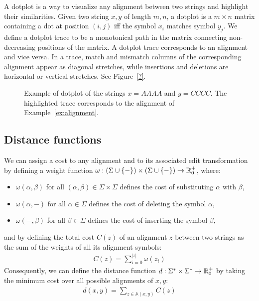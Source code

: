 A dotplot is a way to visualize any alignment between two strings and highlight their similarities.
Given two string $x,y$ of length $m,n$, a dotplot is a $m \times n$ matrix containing a dot at position $(i,j)$ iff the symbol $x_i$ matches symbol $y_j$.
We define a dotplot trace to be a monotonical path in the matrix connecting non-decreasing positions of the matrix.
A dotplot trace corresponds to an alignment and vice versa.
In a trace, match and mismatch columns of the corresponding alignment appear as diagonal stretches, while insertions and deletions are horizontal or vertical stretches.
See Figure~\ref{?}.

\begin{figure}[h]
\begin{center}
\caption[Example of dotplot.]{Example of dotplot of the strings $x=AAAA$ and $y=CCCC$. The highlighted trace corresponds to the alignment of Example~\ref{ex:alignment}.}
\label{fig:dotplot}

\end{center}
\end{figure}

\subsection{Distance functions}

We can assign a cost to any alignment and to its associated edit transformation by defining a weight function $\omega : (\Sigma \cup \{ - \}) \times (\Sigma \cup \{ - \}) \rightarrow \mathbb {R}_0^{+}$, where:
\begin{itemize}
\item $\omega(\alpha,\beta)$ for all $(\alpha,\beta) \in \Sigma \times \Sigma$ defines the cost of substituting $\alpha$ with $\beta$,
\item $\omega(\alpha,-)$ for all $\alpha \in \Sigma$ defines the cost of deleting the symbol $\alpha$,
\item $\omega(-,\beta)$ for all $\beta \in \Sigma$ defines the cost of inserting the symbol $\beta$,
\end{itemize}
and by defining the total cost $C(z)$ of an alignment $z$ between two strings as the sum of the weights of all its alignment symbols:
\begin{eqnarray}
C(z) = \sum_{i=0}^{|z|}{\omega(z_i)}
\end{eqnarray}
Consequently, we can define the distance function $d : \Sigma^{*} \times \Sigma^{*} \rightarrow \mathbb {R}_0^{+}$ by taking the minimum cost over all possible alignments of $x,y$:
\begin{eqnarray}
d(x,y) = \sum_{z \in \mathbb{A}(x,y)}{C(z)}
\end{eqnarray}

